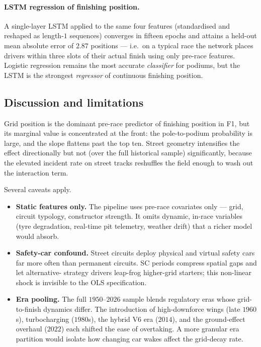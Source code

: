 \documentclass[11pt,a4paper]{article}
\theoremstyle{remark}
\begin{document}
\paragraph{LSTM regression of finishing position.}
A single-layer LSTM applied to the same four features (standardised
and reshaped as length-$1$ sequences) converges in fifteen epochs
and attains a held-out mean absolute error of $2.87$ positions ---
i.e.\ on a typical race the network places drivers within three slots
of their actual finish using only pre-race features. Logistic
regression remains the most accurate \emph{classifier} for podiums,
but the LSTM is the strongest \emph{regressor} of continuous
finishing position.

\subsection{Discussion and limitations}
Grid position is the dominant pre-race predictor of finishing
position in F1, but its marginal value is concentrated at the front:
the pole-to-podium probability is large, and the slope flattens past
the top ten. Street geometry intensifies the effect directionally but
not (over the full historical sample) significantly, because the
elevated incident rate on street tracks reshuffles the field enough
to wash out the interaction term.

Several caveats apply.
\begin{itemize}
  \item \textbf{Static features only.} The pipeline uses pre-race
  covariates only --- grid, circuit typology, constructor strength.
  It omits dynamic, in-race variables (tyre degradation, real-time
  pit telemetry, weather drift) that a richer model would absorb.
  \item \textbf{Safety-car confound.} Street circuits deploy
  physical and virtual safety cars far more often than permanent
  circuits. SC periods compress spatial gaps and let alternative-
  strategy drivers leap-frog higher-grid starters; this non-linear
  shock is invisible to the OLS specification.
  \item \textbf{Era pooling.} The full $1950$--$2026$ sample blends
  regulatory eras whose grid-to-finish dynamics differ. The
  introduction of high-downforce wings (late $1960$s), turbocharging
  ($1980$s), the hybrid V6 era ($2014$), and the ground-effect
  overhaul ($2022$) each shifted the ease of overtaking. A more
  granular era partition would isolate how changing car wakes affect
  the grid-decay rate.
\end{itemize}
\end{document}
